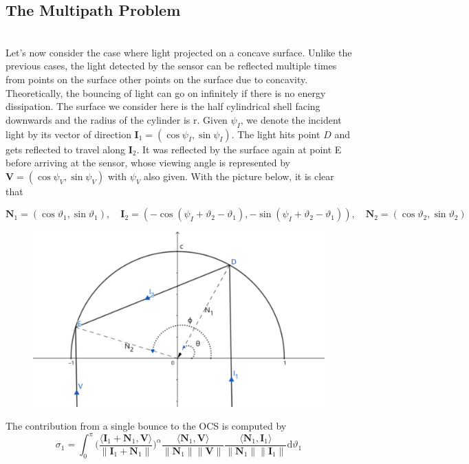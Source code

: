 \documentclass[11pt]{amsart}
\newcommand{\ip}[2]{\langle {#1}, {#2} \rangle}
\theoremstyle{definition}
\begin{document}
\subsection{The Multipath Problem}~\\
Let's now consider the case where light projected on a concave surface. Unlike the previous cases, the light detected by the sensor can be reflected multiple times from points on the surface other points on the surface due to concavity. Theoretically, the bouncing of light can go on infinitely if there is no energy dissipation. The surface we consider here is the half cylindrical shell facing downwards and the radius of the cylinder is r. Given $\psi_I$, we denote the incident light by its vector of direction $\mathbf{I}_1=(\cos\psi_I,\sin\psi_I)$. The light hits point $D$ and gets reflected to travel along $\mathbf{I}_2$. It was reflected by the surface again at point E before arriving at the sensor, whose viewing angle is represented by $\mathbf{V}=(\cos\psi_V,\sin\psi_V)$ with $\psi_V$ also given. With the picture below, it is clear that

$$\mathbf{N}_1=(\cos\vartheta_1,\sin\vartheta_1),\quad \mathbf{I}_2= (-\cos(\psi_I+\vartheta_2-\vartheta_1),-\sin(\psi_I+\vartheta_2-\vartheta_1)),\quad \mathbf{N}_2= (\cos\vartheta_2,\sin\vartheta_2)$$

\begin{figure}[H]
  \includegraphics[width=4.5in]{./figs/multipath.pdf}
  \label{fig:reflection}
\end{figure}


The contribution from a single bounce to the OCS is computed by
$$\sigma_1 =\int_{0}^{\pi}\Bigg(\frac{\ip{\mathbf{I}_1+\mathbf{N}_1}{\mathbf{V}}}{\|\mathbf{I}_1+\mathbf{N}_1\|}\Bigg)^\alpha\frac{\ip{\mathbf{N}_1}{\mathbf{V}}}{\|\mathbf{N}_1\| \|\mathbf{V}\|}\frac{\ip{\mathbf{N}_1}{\mathbf{I}_1}}{\|\mathbf{N}_1\| \|\mathbf{I}_1\|} \mathrm{d}\vartheta_1$$
\end{document}
